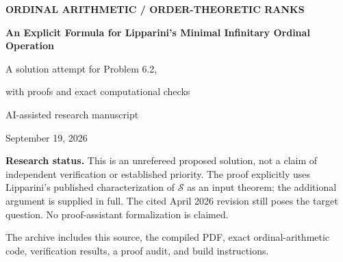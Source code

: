 \documentclass[11pt,letterpaper]{article}
\theoremstyle{definition}
\theoremstyle{remark}
\newcommand{\Sop}{\mathcal S}
\begin{document}
\begin{titlepage}
\vspace*{0.6in}
{\small\sffamily\color{accent}\bfseries ORDINAL ARITHMETIC \quad / \quad ORDER-THEORETIC RANKS\par}
\vspace{0.35in}
{\huge\bfseries\color{ink}An Explicit Formula for Lipparini's Minimal Infinitary Ordinal Operation\par}
\vspace{0.2in}
{\Large A solution attempt for Problem 6.2,\par with proofs and exact computational checks\par}
\vspace{0.35in}
{\large AI-assisted research manuscript\par}
{\large September 19, 2026\par}
\vspace{0.35in}
\begin{abstract}
Lipparini introduced a least weakly monotone operation on countable sequences of ordinals that is strictly increasing at every e-special increase, but left its explicit evaluation as a problem. We give a three-case formula using only a threshold ordinal, a finite list of exceptional entries, Cantor normal forms, natural sums, and ordinal differences. Relative to the previously evaluated operation $\Sop$, the correction is strikingly small: it is either zero, a finite integer, or one natural summand $\omega$.

The new proof has two parts. A block normal form establishes monotonicity even when the threshold changes. A separate lower-bound argument, valid for every admissible operation, forces the correction by finite coordinate changes and an induction through finite successor blocks. We also give an exact equality criterion on comparable sequences, a well-founded rank interpretation, constant-sequence evaluations, cardinality preservation, and a finite multiset model of the correction. An accompanying standard-library Python implementation evaluates hereditary finite Cantor normal forms and supplies reproducible checks.
\end{abstract}
\vspace{0.2in}
\begin{keybox}
\textbf{Research status.} This is an unrefereed proposed solution, not a claim of independent verification or established priority. The proof explicitly uses Lipparini's published characterization of $\Sop$ as an input theorem; the additional argument is supplied in full. The cited April 2026 revision still poses the target question. No proof-assistant formalization is claimed.
\end{keybox}
\vfill
{\small The archive includes this source, the compiled PDF, exact ordinal-arithmetic code, verification results, a proof audit, and build instructions.}
\end{titlepage}
\end{document}
